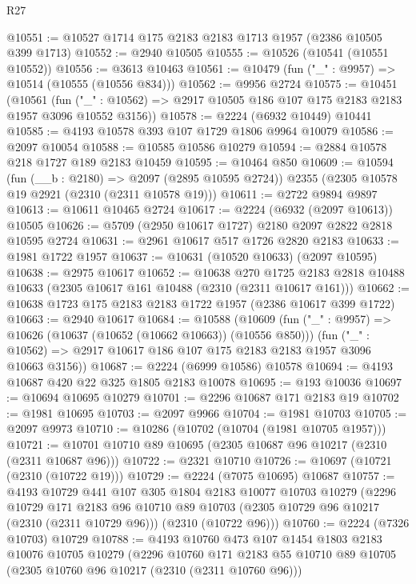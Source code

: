 \begin{lexlean}{R27}
\begin{coremodule}
@10551 := @10527 @1714 @175 @2183 @2183 @1713 @1957 (@2386 @10505 @399 @1713)
@10552 := @2940 @10505
@10555 := @10526 (@10541 (@10551 @10552))
@10556 := @3613 @10463
@10561 := @10479 (fun ("_" : @9957) => @10514 (@10555 (@10556 @834)))
@10562 := @9956 @2724
@10575 := @10451
    (@10561
      (fun ("_" : @10562) => @2917 @10505 @186 @107 @175 @2183 @2183 @1957 @3096 @10552 @3156))
@10578 := @2224 (@6932 @10449) @10441
@10585 := @4193 @10578 @393 @107 @1729 @1806 @9964 @10079
@10586 := @2097 @10054
@10588 := @10585 @10586 @10279
@10594 := @2884 @10578 @218 @1727 @189 @2183 @10459
@10595 := @10464 @850
@10609 := @10594
    (fun (__b : @2180) => @2097 (@2895 @10595 @2724))
    @2355
    (@2305 @10578 @19 @2921 (@2310 (@2311 @10578 @19)))
@10611 := @2722 @9894 @9897
@10613 := @10611 @10465 @2724
@10617 := @2224 (@6932 (@2097 @10613)) @10505
@10626 := @5709 (@2950 @10617 @1727) @2180 @2097 @2822 @2818 @10595 @2724
@10631 := @2961 @10617 @517 @1726 @2820 @2183
@10633 := @1981 @1722 @1957
@10637 := @10631 (@10520 @10633) (@2097 @10595)
@10638 := @2975 @10617
@10652 := @10638
    @270
    @1725
    @2183
    @2818
    @10488
    @10633
    (@2305 @10617 @161 @10488 (@2310 (@2311 @10617 @161)))
@10662 := @10638 @1723 @175 @2183 @2183 @1722 @1957 (@2386 @10617 @399 @1722)
@10663 := @2940 @10617
@10684 := @10588
    (@10609
      (fun ("_" : @9957) => @10626 (@10637 (@10652 (@10662 @10663)) (@10556 @850)))
      (fun ("_" : @10562) => @2917 @10617 @186 @107 @175 @2183 @2183 @1957 @3096 @10663 @3156))
@10687 := @2224 (@6999 @10586) @10578
@10694 := @4193 @10687 @420 @22 @325 @1805 @2183 @10078
@10695 := @193 @10036
@10697 := @10694 @10695 @10279
@10701 := @2296 @10687 @171 @2183 @19
@10702 := @1981 @10695
@10703 := @2097 @9966
@10704 := @1981 @10703
@10705 := @2097 @9973
@10710 := @10286 (@10702 (@10704 (@1981 @10705 @1957)))
@10721 := @10701 @10710 @89 @10695 (@2305 @10687 @96 @10217 (@2310 (@2311 @10687 @96)))
@10722 := @2321 @10710
@10726 := @10697 (@10721 (@2310 (@10722 @19)))
@10729 := @2224 (@7075 @10695) @10687
@10757 := @4193
    @10729
    @441
    @107
    @305
    @1804
    @2183
    @10077
    @10703
    @10279
    (@2296
      @10729
      @171
      @2183
      @96
      @10710
      @89
      @10703
      (@2305 @10729 @96 @10217 (@2310 (@2311 @10729 @96)))
      (@2310 (@10722 @96)))
@10760 := @2224 (@7326 @10703) @10729
@10788 := @4193
    @10760
    @473
    @107
    @1454
    @1803
    @2183
    @10076
    @10705
    @10279
    (@2296
      @10760
      @171
      @2183
      @55
      @10710
      @89
      @10705
      (@2305 @10760 @96 @10217 (@2310 (@2311 @10760 @96)))

\end{coremodule}
\end{lexlean}
